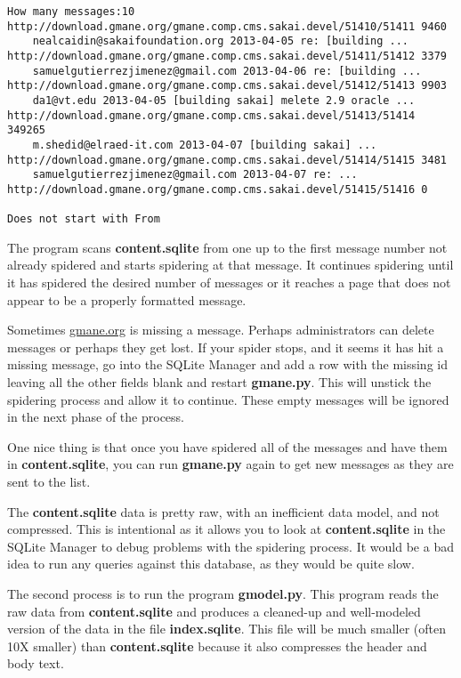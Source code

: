\beforeverb
\begin{verbatim}
How many messages:10
http://download.gmane.org/gmane.comp.cms.sakai.devel/51410/51411 9460
    nealcaidin@sakaifoundation.org 2013-04-05 re: [building ...
http://download.gmane.org/gmane.comp.cms.sakai.devel/51411/51412 3379
    samuelgutierrezjimenez@gmail.com 2013-04-06 re: [building ...
http://download.gmane.org/gmane.comp.cms.sakai.devel/51412/51413 9903
    da1@vt.edu 2013-04-05 [building sakai] melete 2.9 oracle ...
http://download.gmane.org/gmane.comp.cms.sakai.devel/51413/51414 349265
    m.shedid@elraed-it.com 2013-04-07 [building sakai] ...
http://download.gmane.org/gmane.comp.cms.sakai.devel/51414/51415 3481
    samuelgutierrezjimenez@gmail.com 2013-04-07 re: ...
http://download.gmane.org/gmane.comp.cms.sakai.devel/51415/51416 0

Does not start with From 
\end{verbatim}
\afterverb
%
The program scans {\bf content.sqlite} from one up to the first message number not
already spidered and starts spidering at that message.  It continues spidering
until it has spidered the desired number of messages or it reaches a page
that does not appear to be a properly formatted message.

Sometimes \url{gmane.org} is missing a message.  Perhaps administrators can delete messages
or perhaps they get lost.   If your spider stops, and it seems it has hit
a missing message, go into the SQLite Manager and add a row with the missing id leaving
all the other fields blank and restart {\bf gmane.py}.   This will unstick the 
spidering process and allow it to continue.  These empty messages will be ignored in the next
phase of the process.

One nice thing is that once you have spidered all of the messages and have them in 
{\bf content.sqlite}, you can run {\bf gmane.py} again to get new messages as 
they are sent to the list.  

The {\bf content.sqlite} data is pretty raw, with an inefficient data model, 
and not compressed.
This is intentional as it allows you to look at {\bf content.sqlite}
in the SQLite Manager to debug problems with the spidering process.
It would be a bad idea to run any queries against this database, as they 
would be quite slow.

The second process is to run the program {\bf gmodel.py}.  This program reads the raw 
data from {\bf content.sqlite} and produces a cleaned-up and well-modeled version of the 
data in the file {\bf index.sqlite}.  This file will be much smaller (often 10X
smaller) than {\bf content.sqlite} because it also compresses the header and body text.

